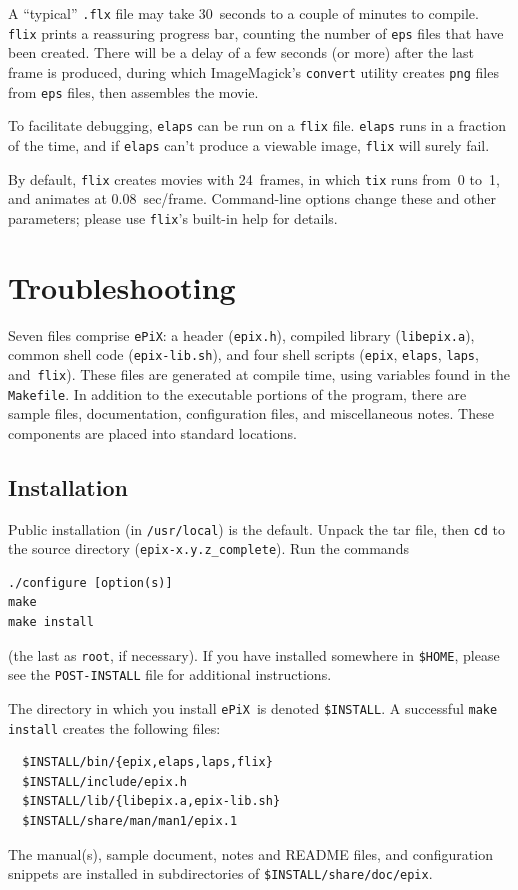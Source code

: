 \documentclass[12pt]{report}
\newcommand{\code}[1]{\texttt{#1}}
\newcommand{\filename}[1]{\texttt{#1}}
\newcommand{\ePiX}{\code{ePiX}}
\begin{document}
A ``typical'' \code{.flx} file may take 30~seconds to a couple of
minutes to compile.  \code{flix} prints a reassuring progress bar,
counting the number of \filename{eps} files that have been
created. There will be a delay of a few seconds (or more) after the
last frame is produced, during which ImageMagick's \code{convert}
utility creates \code{png} files from \filename{eps} files, then
assembles the movie.

To facilitate debugging, \code{elaps} can be run on a \code{flix}
file. \code{elaps} runs in a fraction of the time, and if \code{elaps}
can't produce a viewable image, \code{flix} will surely fail.

By default, \code{flix} creates movies with 24~frames, in which
\code{tix} runs from~0 to~1, and animates at $0.08$~sec/frame.
Command-line options change these and other parameters; please use
\code{flix}'s built-in help for details.  


\section{Troubleshooting}

Seven files comprise \ePiX: a header (\filename{epix.h}), compiled
library (\filename{libepix.a}), common shell code
(\filename{epix-lib.sh}), and four shell scripts (\code{epix},
\code{elaps}, \code{laps}, and~\code{flix}). These files are generated
at compile time, using variables found in the \filename{Makefile}.  In
addition to the executable portions of the program, there are sample
files, documentation, configuration files, and miscellaneous notes.
These components are placed into standard locations.


\subsection*{Installation}

Public installation (in \code{/usr/local}) is the default. Unpack the
tar file, then \code{cd} to the source directory
(\filename{epix-x.y.z\_complete}). Run the commands
\begin{verbatim}
./configure [option(s)]
make
make install
\end{verbatim}
(the last as \code{root}, if necessary).  If you have installed
somewhere in \filename{\$HOME}, please see the \filename{POST-INSTALL}
file for additional instructions.

The directory in which you install \ePiX\ is denoted
\filename{\$INSTALL}. A successful \code{make install} creates the
following files:
\begin{verbatim}
  $INSTALL/bin/{epix,elaps,laps,flix}
  $INSTALL/include/epix.h
  $INSTALL/lib/{libepix.a,epix-lib.sh}
  $INSTALL/share/man/man1/epix.1
\end{verbatim}
The manual(s), sample document, notes and README files, and
configuration snippets are installed in subdirectories of
\filename{\$INSTALL/share/doc/epix}.
\end{document}

